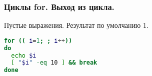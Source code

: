 \begin{frame}[fragile]
\frametitle{ Циклы for. Выход из цикла.}
  \begin{block}{Пустые выражения. Результат по умолчанию 1. }
    \begin{lstlisting}[language=sh,frame=single]
for (( i=1; ; i++))
do
  echo $i 
  [ "$i" -eq 10 ] && break 
done
    \end{lstlisting}
  \end{block}
\end{frame}
